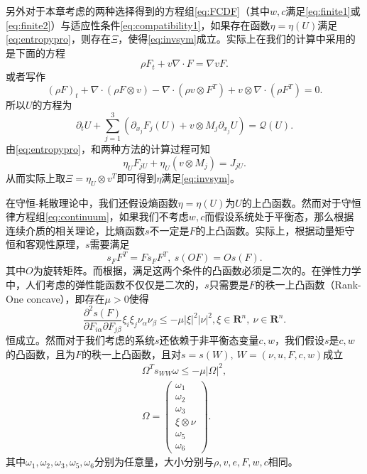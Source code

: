 \documentclass{article}
\begin{document}
另外对于本章考虑的两种选择得到的方程组\eqref{eq:FCDF}（其中$w,c$满足\eqref{eq:finite1}或\eqref{eq:finite2}）与适应性条件\eqref{eq:compatibility1}，如果存在函数$\eta = \eta(U)$满足\eqref{eq:entropypro}，则存在$\Xi$，使得\eqref{eq:invsym}成立。实际上在我们的计算中采用的是下面的方程
\begin{equation*}
	\rho F_t + v \nabla \cdot F = \nabla v F.
\end{equation*}
或者写作
\begin{equation*}
(\rho F)_t + \nabla \cdot (\rho F \otimes v) - \nabla \cdot (\rho v \otimes F^T) + v \otimes \nabla \cdot (\rho F^T) = 0 .
\end{equation*}
所以$U$的方程为
\begin{equation*}
	\partial_t U + \sum_{j=1}^3 (\partial_{x_j} F_j(U) + v\otimes M_j \partial_{x_j} U)= \mathcal{Q} (U) .
\end{equation*}
由\eqref{eq:entropypro}，和两种方法的计算过程可知
\begin{equation*}
	\eta_U F_{jU} + \eta_{U} (v \otimes M_{j}) = J_{jU}.
\end{equation*}
从而实际上取$\Xi = \eta_U \otimes v^T$即可得到$\eta$满足\eqref{eq:invsym}。

在守恒-耗散理论中，我们还假设熵函数$\eta=\eta(U)$为$U$的上凸函数。然而对于守恒律方程组\eqref{eq:continuum}，如果我们不考虑$w,c$而假设系统处于平衡态，那么根据连续介质的相关理论\cite{ball1976convexity,dimitrienko2010nonlinear,dafermos2013non}，比熵函数$s$不一定是$F$的上凸函数。实际上，根据动量矩守恒和客观性原理，$s$需要满足
\begin{equation}\label{eq:sObjective}
	s_F F^T = F s_F F^T, \ s(OF) = O s(F).
\end{equation}
其中$O$为旋转矩阵\cite{dafermos2013non}。而根据\cite{ball1976convexity}，满足这两个条件的凸函数必须是二次的。在弹性力学中，人们考虑的弹性能函数不仅仅是二次的，$s$只需要是$F$的秩一上凸函数（Rank-One concave），即存在$\mu>0$使得
\begin{equation*}
	\frac{\partial^2 s(F)}{\partial F_{i\alpha} \partial F_{j\beta}} \xi_i \xi_j \nu_\alpha \nu_\beta \le -\mu |\xi|^2 |\nu|^2, \xi \in \mathbf{R}^n, \ \nu \in \mathbf{R}^n. 
\end{equation*}
恒成立。然而对于我们考虑的系统$s$还依赖于非平衡态变量$c,w$，我们假设$s$是$c,w$的凸函数，且为$F$的秩一上凸函数，且对$s=s(W),\ W= (\nu,u,F,c,w)$成立
\begin{eqnarray}
	\Omega^T s_{WW} \omega \le -\mu |\Omega|^2, \label{eq:FCDFconvex}\\ 
	\Omega = \left( \begin{array}{c}
		\omega_1 \\ \omega_2 \\ \omega_3 \\ \xi \otimes \nu \\ \omega_5 \\ \omega_6
	\end{array}\right). \nonumber
\end{eqnarray}
其中$\omega_1,\omega_2,\omega_3,\omega_5,\omega_6$分别为任意量，大小分别与$\rho, v,e, F,w,c$相同。
\end{document}
